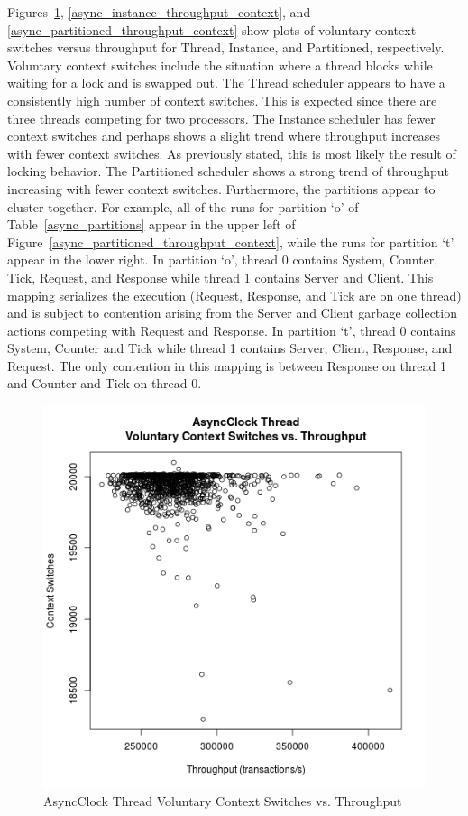 Figures~\ref{async_thread_throughput_context}, \ref{async_instance_throughput_context}, and \ref{async_partitioned_throughput_context} show plots of voluntary context switches versus throughput for Thread, Instance, and Partitioned, respectively.
Voluntary context switches include the situation where a thread blocks while waiting for a lock and is swapped out.
The Thread scheduler appears to have a consistently high number of context switches.
This is expected since there are three threads competing for two processors.
The Instance scheduler has fewer context switches and perhaps shows a slight trend where throughput increases with fewer context switches.
As previously stated, this is most likely the result of locking behavior.
The Partitioned scheduler shows a strong trend of throughput increasing with fewer context switches.
Furthermore, the partitions appear to cluster together.
For example, all of the runs for partition `o' of Table~\ref{async_partitions} appear in the upper left of Figure~\ref{async_partitioned_throughput_context}, while the runs for partition `t' appear in the lower right.
In partition `o', thread 0 contains System, Counter, Tick, Request, and Response while thread 1 contains Server and Client.
This mapping serializes the execution (Request, Response, and Tick are on one thread) and is subject to contention arising from the Server and Client garbage collection actions competing with Request and Response.
In partition `t', thread 0 contains System, Counter and Tick while thread 1 contains Server, Client, Response, and Request.
The only contention in this mapping is between Response on thread 1 and Counter and Tick on thread 0.

\begin{figure}
\center
\includegraphics[height=.4\textheight]{async_thread_throughput_context.png}
\caption{AsyncClock Thread Voluntary Context Switches vs. Throughput}
\label{async_thread_throughput_context}
\end{figure}

